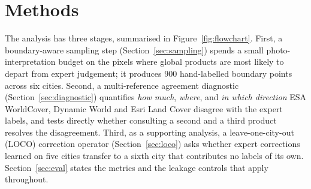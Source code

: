 
\section{Methods}\label{sec:methods}

The analysis has three stages, summarised in Figure~\ref{fig:flowchart}.
First, a boundary-aware sampling step (Section~\ref{sec:sampling}) spends a
small photo-interpretation budget on the pixels where global products are most
likely to depart from expert judgement; it produces 900 hand-labelled boundary
points across six cities. Second, a multi-reference agreement diagnostic
(Section~\ref{sec:diagnostic}) quantifies \emph{how much}, \emph{where}, and
\emph{in which direction} ESA WorldCover, Dynamic World and Esri Land Cover
disagree with the expert labels, and tests directly whether consulting a second
and a third product resolves the disagreement. Third, as a supporting analysis,
a leave-one-city-out (LOCO) correction operator (Section~\ref{sec:loco}) asks
whether expert corrections learned on five cities transfer to a sixth city that
contributes no labels of its own. Section~\ref{sec:eval} states the metrics and
the leakage controls that apply throughout.

